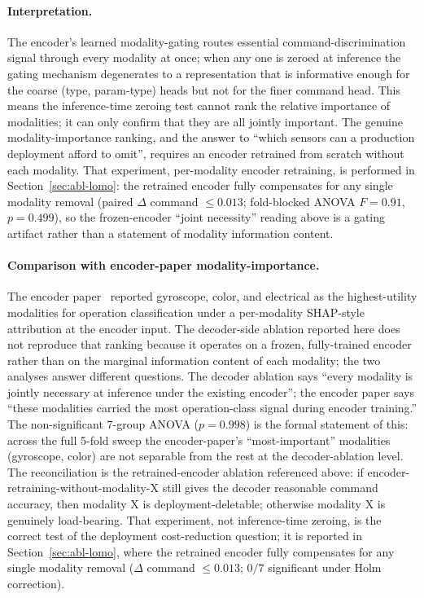 \documentclass[sensors,article,submit,moreauthors,pdftex]{Definitions/mdpi}
\begin{document}
\paragraph{Interpretation.} The encoder's learned modality-gating routes essential command-discrimination signal through every modality at once; when any one is zeroed at inference the gating mechanism degenerates to a representation that is informative enough for the coarse (type, param-type) heads but not for the finer command head. This means the inference-time zeroing test cannot rank the relative importance of modalities; it can only confirm that they are all jointly important. The genuine modality-importance ranking, and the answer to ``which sensors can a production deployment afford to omit'', requires an encoder retrained from scratch without each modality. That experiment, per-modality encoder retraining, is performed in Section~\ref{sec:abl-lomo}: the retrained encoder fully compensates for any single modality removal (paired $\Delta$ command $\le 0.013$; fold-blocked ANOVA $F=0.91$, $p=0.499$), so the frozen-encoder ``joint necessity'' reading above is a gating artifact rather than a statement of modality information content.

\paragraph{Comparison with encoder-paper modality-importance.} The encoder paper~\cite{encoder_paper} reported gyroscope, color, and electrical as the highest-utility modalities for operation classification under a per-modality SHAP-style attribution at the encoder input. The decoder-side ablation reported here does not reproduce that ranking because it operates on a frozen, fully-trained encoder rather than on the marginal information content of each modality; the two analyses answer different questions. The decoder ablation says ``every modality is jointly necessary at inference under the existing encoder''; the encoder paper says ``these modalities carried the most operation-class signal during encoder training.'' The non-significant $7$-group ANOVA ($p=0.998$) is the formal statement of this: across the full 5-fold sweep the encoder-paper's ``most-important'' modalities (gyroscope, color) are not separable from the rest at the decoder-ablation level. The reconciliation is the retrained-encoder ablation referenced above: if encoder-retraining-without-modality-X still gives the decoder reasonable command accuracy, then modality X is deployment-deletable; otherwise modality X is genuinely load-bearing. That experiment, not inference-time zeroing, is the correct test of the deployment cost-reduction question; it is reported in Section~\ref{sec:abl-lomo}, where the retrained encoder fully compensates for any single modality removal ($\Delta$ command $\le 0.013$; $0/7$ significant under Holm correction).
\end{document}

